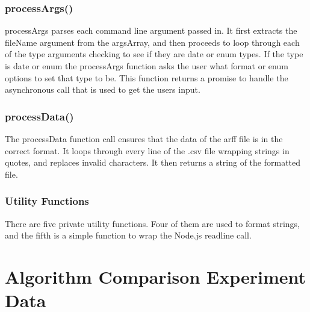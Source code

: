 \documentclass[11pt]{article} %
\begin{document}
\subsubsection{processArgs()}
processArgs parses each command line argument passed in. It first extracts the fileName argument from the argsArray, and then proceeds to loop through each of the type arguments checking to see if they are date or enum types. If the type is date or enum the processArgs function asks the user what format or enum options to set that type to be. This function returns a promise to handle the asynchronous call that is used to get the users input.

\subsubsection{processData()}
The processData function call ensures that the data of the arff file is in the correct format. It loops through every line of the .csv file wrapping strings in quotes, and replaces invalid characters. It then returns a string of the formatted file.

\subsubsection{Utility Functions}
There are five private utility functions. Four of them are used to format strings, and the fifth is a simple function to wrap the Node.js readline call.

\section{Algorithm Comparison Experiment Data}
\end{document}
